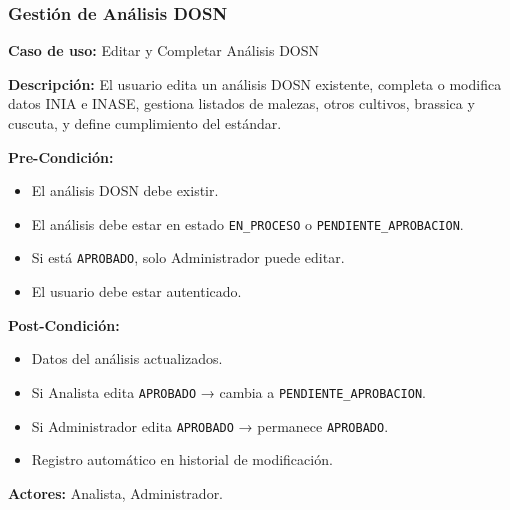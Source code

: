 \subsubsection{Gestión de Análisis DOSN}

\noindent\textbf{Caso de uso:} Editar y Completar Análisis DOSN

\vspace{0.5em}
\noindent\textbf{Descripción:} El usuario edita un análisis DOSN existente, completa o modifica datos INIA e INASE, gestiona listados de malezas, otros cultivos, brassica y cuscuta, y define cumplimiento del estándar.

\vspace{0.5em}
\noindent\textbf{Pre-Condición:}
\begin{itemize}[nosep]
    \item El análisis DOSN debe existir.
    \item El análisis debe estar en estado \texttt{EN\_PROCESO} o \texttt{PENDIENTE\_APROBACION}.
    \item Si está \texttt{APROBADO}, solo Administrador puede editar.
    \item El usuario debe estar autenticado.
\end{itemize}

\vspace{0.5em}
\noindent\textbf{Post-Condición:}
\begin{itemize}[nosep]
    \item Datos del análisis actualizados.
    \item Si Analista edita \texttt{APROBADO} → cambia a \texttt{PENDIENTE\_APROBACION}.
    \item Si Administrador edita \texttt{APROBADO} → permanece \texttt{APROBADO}.
    \item Registro automático en historial de modificación.
\end{itemize}

\vspace{0.5em}
\noindent\textbf{Actores:} Analista, Administrador.

